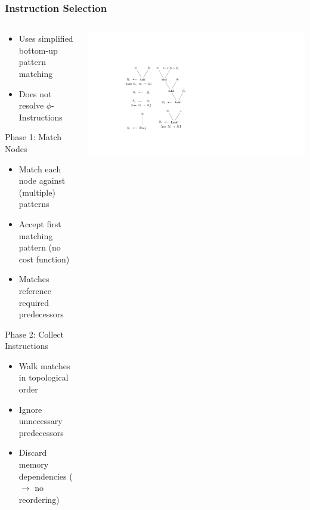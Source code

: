 \documentclass[navbaroff,en]{sdqbeamer}
\begin{document}
\begin{frame}
	\frametitle{Instruction Selection}
	\begin{columns}
		\begin{column}{0.55\textwidth}
			\begin{itemize}
				\item Uses simplified bottom-up pattern matching
				\item Does not resolve $\phi$-Instructions
			\end{itemize}

			\vspace{1em}

			\begin{contentblock}{Phase 1: Match Nodes}
				\begin{itemize}
					\item Match each node against (multiple) patterns
					\item Accept first matching pattern (no cost function)
					\item Matches reference required predecessors
				\end{itemize}
			\end{contentblock}

			\begin{contentblock}{Phase 2: Collect Instructions}
				\begin{itemize}
					\item Walk matches in topological order
					\item Ignore unnecessary predecessors
					\item Discard memory dependencies ($\rightarrow$ no reordering)
				\end{itemize}
			\end{contentblock}
		\end{column}
		\begin{column}{0.44\textwidth}
		 	\centering \includegraphics[scale=0.4]{images/pattern.ipe.pdf}
		\end{column}
	\end{columns}



\end{frame}
\end{document}
